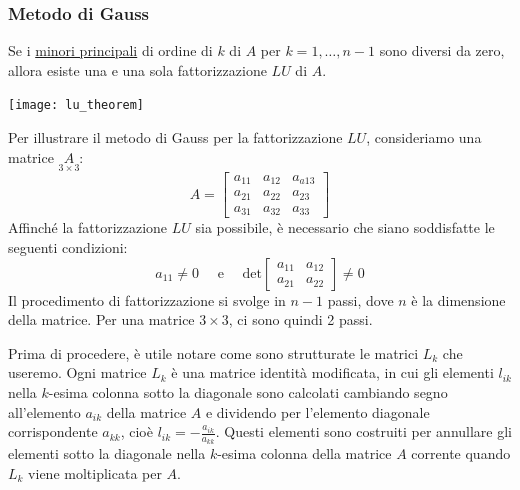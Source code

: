 \documentclass{article}
\begin{document}
\subsubsection{Metodo di Gauss}
\begin{theorem}
    Se i \underline{minori principali} di ordine di $k$ di $A$ per
    $k=1,\ldots,n-1$ sono diversi da zero, allora esiste una e una sola
    fattorizzazione $LU$ di $A$.
\end{theorem}

\begin{center}
    \texttt{[image: lu\_theorem]}
\end{center}

Per illustrare il metodo di Gauss per la fattorizzazione $LU$, consideriamo
una matrice $\underset{3\times3}A$:
$$A=\begin{bmatrix}
    a_{11} & a_{12} & a_{a13} \\ 
    a_{21} & a_{22} & a_{23} \\ 
    a_{31} & a_{32} & a_{33}
\end{bmatrix}$$
Affinché la fattorizzazione $LU$ sia possibile, è necessario che siano
soddisfatte le seguenti condizioni:
$$
a_{11}\neq0 \quad \text{ e } \quad \text{det}\begin{bmatrix}
    a_{11} & a_{12} \\ 
    a_{21} & a_{22}
\end{bmatrix}\neq0
        $$
Il procedimento di fattorizzazione si svolge in $n-1$ passi, dove $n$ è la
dimensione della matrice. Per una matrice $3\times3$, ci sono quindi 2 passi.

Prima di procedere, è utile notare come sono strutturate le matrici $L_{k}$
che useremo. Ogni matrice $L_k$ è una matrice identità modificata, in cui gli
elementi $l_{ik}$ nella $k$-esima colonna sotto la diagonale sono calcolati
cambiando segno all'elemento $a_{ik}$ della matrice $A$ e dividendo per
l'elemento diagonale corrispondente $a_{kk}$, cioè
$l_{ik}=-\frac{a_{ik}}{a_{kk}}$. Questi elementi sono costruiti per annullare
gli elementi sotto la diagonale nella $k$-esima colonna della matrice $A$
corrente quando $L_{k}$ viene moltiplicata per $A$.
\end{document}
